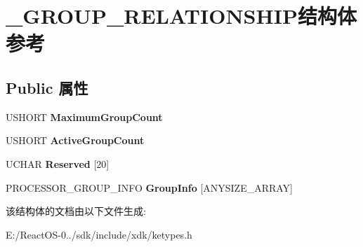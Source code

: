 \hypertarget{struct___g_r_o_u_p___r_e_l_a_t_i_o_n_s_h_i_p}{}\section{\+\_\+\+G\+R\+O\+U\+P\+\_\+\+R\+E\+L\+A\+T\+I\+O\+N\+S\+H\+I\+P结构体 参考}
\label{struct___g_r_o_u_p___r_e_l_a_t_i_o_n_s_h_i_p}
\subsection*{Public 属性}
\begin{DoxyCompactItemize}
\item 
\mbox{\label{struct___g_r_o_u_p___r_e_l_a_t_i_o_n_s_h_i_p_aa98e8cdb71c8bddf87e8bc72291fdabe}} 
U\+S\+H\+O\+RT {\bfseries Maximum\+Group\+Count}
\item 
\mbox{\label{struct___g_r_o_u_p___r_e_l_a_t_i_o_n_s_h_i_p_aad4187f284ca5450e58a754def8e9217}} 
U\+S\+H\+O\+RT {\bfseries Active\+Group\+Count}
\item 
\mbox{\label{struct___g_r_o_u_p___r_e_l_a_t_i_o_n_s_h_i_p_adfaa16f09357fe30e4fd682f59a342ea}} 
U\+C\+H\+AR {\bfseries Reserved} \mbox{[}20\mbox{]}
\item 
\mbox{\label{struct___g_r_o_u_p___r_e_l_a_t_i_o_n_s_h_i_p_a1fae6cb2fdc186d7fc6c7721a74b8dd1}} 
P\+R\+O\+C\+E\+S\+S\+O\+R\+\_\+\+G\+R\+O\+U\+P\+\_\+\+I\+N\+FO {\bfseries Group\+Info} \mbox{[}A\+N\+Y\+S\+I\+Z\+E\+\_\+\+A\+R\+R\+AY\mbox{]}
\end{DoxyCompactItemize}


该结构体的文档由以下文件生成\+:\begin{DoxyCompactItemize}
\item 
E\+:/\+React\+O\+S-\/0../sdk/include/xdk/ketypes.\+h\end{DoxyCompactItemize}
